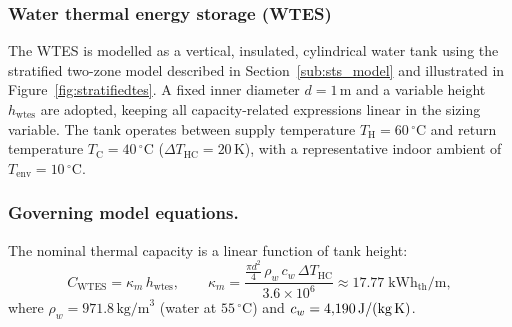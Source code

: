 \documentclass[11pt,a4paper]{report}
\begin{document}
\subsubsection{Water thermal energy storage (WTES)}
\label{sub:wtes_model}

The WTES is modelled as a vertical, insulated, cylindrical water tank using the
stratified two-zone model described in Section~\ref{sub:sts_model} and
illustrated in Figure~\ref{fig:stratifiedtes}.
A fixed inner diameter $d = 1\,\text{m}$ and a variable height $h_\mathrm{wtes}$
are adopted, keeping all capacity-related expressions linear in the sizing variable.
The tank operates between supply temperature $T_\mathrm{H} = 60\,^{\circ}\mathrm{C}$
and return temperature $T_\mathrm{C} = 40\,^{\circ}\mathrm{C}$
($\Delta T_\mathrm{HC} = 20\,\mathrm{K}$), with a representative indoor ambient
of $T_\mathrm{env} = 10\,^{\circ}\mathrm{C}$.

\subsubsection{Governing model equations.}

The nominal thermal capacity is a linear function of tank height:
\begin{equation}
    C_\mathrm{WTES} = \kappa_m \, h_\mathrm{wtes},
    \qquad
    \kappa_m = \frac{\tfrac{\pi d^2}{4}\,\rho_w\,c_w\,\Delta T_\mathrm{HC}}{3.6\times10^6}
    \approx 17.77\;\text{kWh}_\mathrm{th}/\text{m},
    \label{eq:wtes_capacity}
\end{equation}
where $\rho_w = 971.8\,\text{kg/m}^3$ (water at $55\,^{\circ}\mathrm{C}$)
and $c_w = 4{,}190\,\text{J/(kg\,K)}$.
\end{document}
